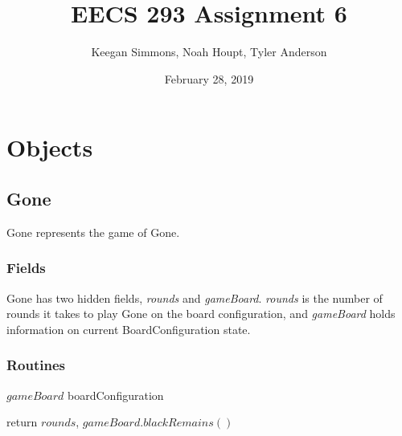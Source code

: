 \documentclass{article}
\title{EECS 293 Assignment 6}
\author{Keegan Simmons, Noah Houpt, Tyler Anderson}
\date{February 28, 2019}
\begin{document}
\maketitle

\section{Objects}

\subsection{Gone}
Gone represents the game of Gone. 

\subsubsection{Fields}
Gone has two hidden fields, \textit{rounds} and \textit{gameBoard}.  \textit{rounds} is the number of rounds it takes to play Gone on the board configuration, and \textit{gameBoard} holds information on current BoardConfiguration state.

\linebreak
\subsubsection{Routines}
\begin{algorithm}[H]
\SetAlgoLined
\caption{}
$gameBoard$ \xleftarrow[]{} boardConfiguration
\end{algorithm}
\linebreak
\begin{algorithm}[H]
\SetAlgoLined
\caption{}
return $rounds$, $gameBoard.blackRemains()$\\
\end{algorithm}

\linebreak
\linebreak
\end{document}
